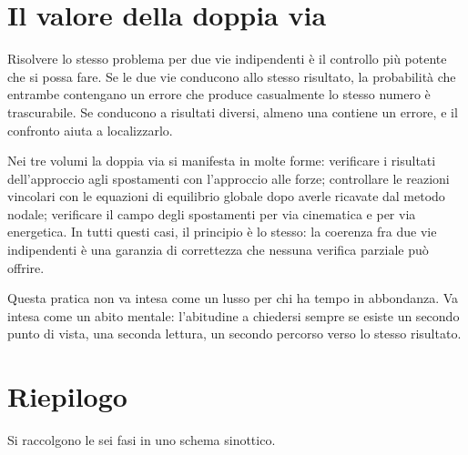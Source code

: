 \section*{Il valore della doppia via}

Risolvere lo stesso problema per due vie indipendenti è il controllo più potente che si possa fare. Se le due vie conducono allo stesso risultato, la probabilità che entrambe contengano un errore che produce casualmente lo stesso numero è trascurabile. Se conducono a risultati diversi, almeno una contiene un errore, e il confronto aiuta a localizzarlo.

Nei tre volumi la doppia via si manifesta in molte forme: verificare i risultati dell'approccio agli spostamenti con l'approccio alle forze; controllare le reazioni vincolari con le equazioni di equilibrio globale dopo averle ricavate dal metodo nodale; verificare il campo degli spostamenti per via cinematica e per via energetica. In tutti questi casi, il principio è lo stesso: la coerenza fra due vie indipendenti è una garanzia di correttezza che nessuna verifica parziale può offrire.

Questa pratica non va intesa come un lusso per chi ha tempo in abbondanza. Va intesa come un abito mentale: l'abitudine a chiedersi sempre se esiste un secondo punto di vista, una seconda lettura, un secondo percorso verso lo stesso risultato.


\section*{Riepilogo}

Si raccolgono le sei fasi in uno schema sinottico.

